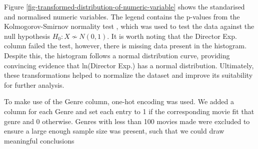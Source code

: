         Figure \ref*{fig-transformed-distribution-of-numeric-variable} shows the
        standarised and normalised numeric variables. The legend contains the p-values
        from the Kolmogorov-Smirnov normality test \cite*{KStest}, which was used to
        test the data against the null hypothesis $H_{0}: X \not\sim N(0,1)$. It is
        worth noting that the Director Exp. column failed the test, however, there is
        missing data present in the histogram. Despite this, the histogram follows a
        normal distribution curve, providing convincing evidence that ln(Director Exp.)
        has a normal distribution. Ultimately, these transformations helped to normalize
        the dataset and improve its suitability for further analysis.

        To make use of the Genre column, one-hot encoding was used.
        We added a column for each Genre and set each entry to 1 if the corresponding movie
            fit that genre and 0 otherwise.
        Genres with less than 100 movies made were excluded to ensure a large enough sample size
            was present, such that we could draw meaningful conclusions